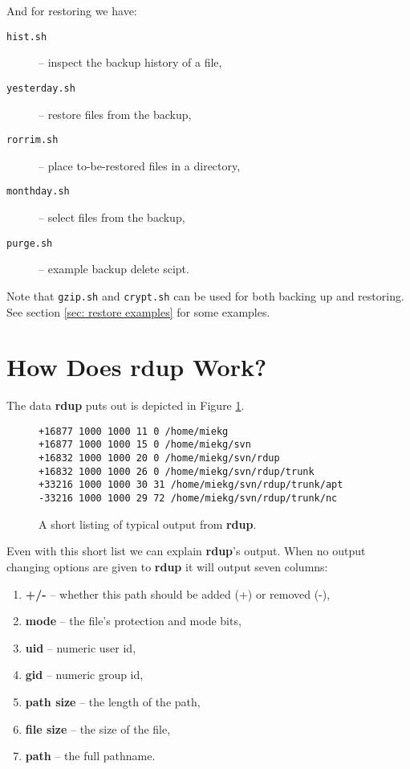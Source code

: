 \documentclass[a4paper, openany]{memoir}
\newcommand{\rdup}{\textbf{rdup}}
\newcommand{\cmd}[1]{\texttt{#1}}
\begin{document}
And for restoring we have:
\begin{description}
\item[\cmd{hist.sh}]{-- inspect the backup history of a file,}
\item[\cmd{yesterday.sh}]{-- restore files from the backup,}
\item[\cmd{rorrim.sh}]{-- place to-be-restored files in a directory,}
\item[\cmd{monthday.sh}]{-- select files from the backup,}
\item[\cmd{purge.sh}]{-- example backup delete scipt.}
\end{description}

Note that \cmd{gzip.sh} and \cmd{crypt.sh} can be used for 
both backing up and restoring. See section \ref{sec: restore examples}
for some examples.

\section{How Does \rdup{} Work?}
The data \rdup{} puts out is depicted in Figure \ref{fig:rdup output}.
\begin{figure}[hbt]
\begin{verbatim}
+16877 1000 1000 11 0 /home/miekg
+16877 1000 1000 15 0 /home/miekg/svn
+16832 1000 1000 20 0 /home/miekg/svn/rdup
+16832 1000 1000 26 0 /home/miekg/svn/rdup/trunk
+33216 1000 1000 30 31 /home/miekg/svn/rdup/trunk/apt
-33216 1000 1000 29 72 /home/miekg/svn/rdup/trunk/nc
\end{verbatim}
\caption{A short listing of typical output from \rdup.}
\label{fig:rdup output}
\end{figure}

Even with this short list we can explain \rdup's output. When no
output changing options are given to \rdup{} it will output seven
columns:
\begin{enumerate}
\item{\textbf{+/-} -- whether this path should be added (+) or removed
(-),}
\item{\textbf{mode} -- the file's protection and mode bits,}
\item{\textbf{uid} -- numeric user id,}
\item{\textbf{gid} -- numeric group id,}
\item{\textbf{path size} -- the length of the path,}
\item{\textbf{file size} -- the size of the file,}
\item{\textbf{path} -- the full pathname.}
\end{enumerate}
\end{document}
